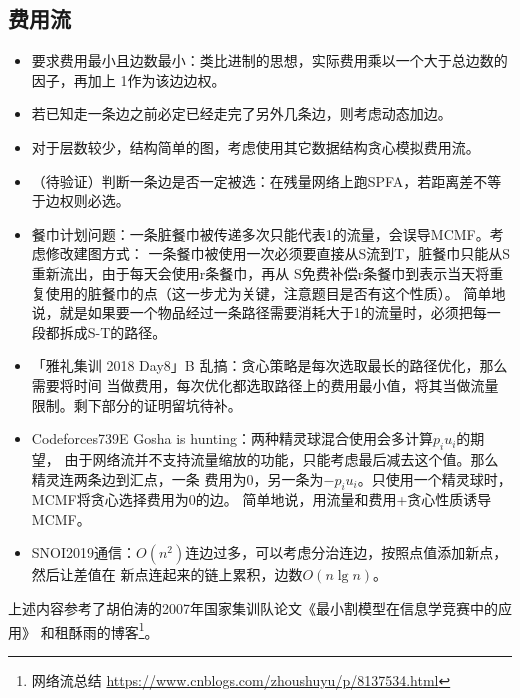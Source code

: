 \subsection{费用流}
\begin{itemize}
    \item 要求费用最小且边数最小：类比进制的思想，实际费用乘以一个大于总边数的因子，再加上
    1作为该边边权。
    \item 若已知走一条边之前必定已经走完了另外几条边，则考虑动态加边。
    \item 对于层数较少，结构简单的图，考虑使用其它数据结构贪心模拟费用流。
    \item （待验证）判断一条边是否一定被选：在残量网络上跑SPFA，若距离差不等于边权则必选。
    \item 餐巾计划问题：一条脏餐巾被传递多次只能代表1的流量，会误导MCMF。考虑修改建图方式：
    一条餐巾被使用一次必须要直接从S流到T，脏餐巾只能从S重新流出，由于每天会使用r条餐巾，再从
    S免费补偿r条餐巾到表示当天将重复使用的脏餐巾的点（这一步尤为关键，注意题目是否有这个性质）。
    简单地说，就是如果要一个物品经过一条路径需要消耗大于1的流量时，必须把每一段都拆成S-T的路径。

    \item 「雅礼集训 2018 Day8」B 乱搞：贪心策略是每次选取最长的路径优化，那么需要将时间
    当做费用，每次优化都选取路径上的费用最小值，将其当做流量限制。剩下部分的证明留坑待补。
    \item Codeforces739E Gosha is hunting：两种精灵球混合使用会多计算$p_iu_i$的期望，
    由于网络流并不支持流量缩放的功能，只能考虑最后减去这个值。那么精灵连两条边到汇点，一条
    费用为0，另一条为$-p_iu_i$。只使用一个精灵球时，MCMF将贪心选择费用为0的边。
    简单地说，用流量和费用+贪心性质诱导MCMF。
    \item SNOI2019通信：$O(n^2)$连边过多，可以考虑分治连边，按照点值添加新点，然后让差值在
    新点连起来的链上累积，边数$O(n\lg n)$。
\end{itemize}

上述内容参考了胡伯涛的2007年国家集训队论文《最小割模型在信息学竞赛中的应用》
\cite{MCIOI}和租酥雨的博客\footnote{
    网络流总结
    \url{https://www.cnblogs.com/zhoushuyu/p/8137534.html}
}。
